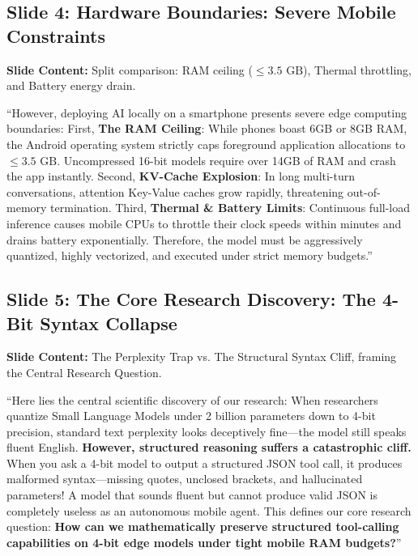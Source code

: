 \documentclass[11pt,a4paper]{article}
\begin{document}
\subsection{Slide 4: Hardware Boundaries: Severe Mobile Constraints}
\textbf{Slide Content:} Split comparison: RAM ceiling ($\le 3.5\text{ GB}$), Thermal throttling, and Battery energy drain.

\begin{scriptbox}
``However, deploying AI locally on a smartphone presents severe edge computing boundaries:
First, \textbf{The RAM Ceiling}: While phones boast 6GB or 8GB RAM, the Android operating system strictly caps foreground application allocations to $\le 3.5\text{ GB}$. Uncompressed 16-bit models require over 14GB of RAM and crash the app instantly.
Second, \textbf{KV-Cache Explosion}: In long multi-turn conversations, attention Key-Value caches grow rapidly, threatening out-of-memory termination.
Third, \textbf{Thermal \& Battery Limits}: Continuous full-load inference causes mobile CPUs to throttle their clock speeds within minutes and drains battery exponentially.
Therefore, the model must be aggressively quantized, highly vectorized, and executed under strict memory budgets.''
\end{scriptbox}

\subsection{Slide 5: The Core Research Discovery: The 4-Bit Syntax Collapse}
\textbf{Slide Content:} The Perplexity Trap vs. The Structural Syntax Cliff, framing the Central Research Question.

\begin{scriptbox}
``Here lies the central scientific discovery of our research:
When researchers quantize Small Language Models under 2 billion parameters down to 4-bit precision, standard text perplexity looks deceptively fine---the model still speaks fluent English.
\textbf{However, structured reasoning suffers a catastrophic cliff.} When you ask a 4-bit model to output a structured JSON tool call, it produces malformed syntax---missing quotes, unclosed brackets, and hallucinated parameters!
A model that sounds fluent but cannot produce valid JSON is completely useless as an autonomous mobile agent.
This defines our core research question: \textbf{How can we mathematically preserve structured tool-calling capabilities on 4-bit edge models under tight mobile RAM budgets?}''
\end{scriptbox}
\end{document}
